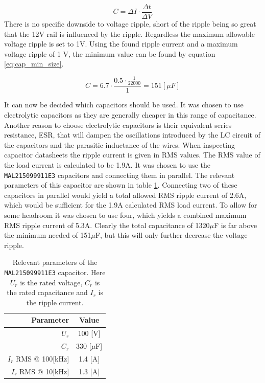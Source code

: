 \begin{equation} 
	C = \Delta I \cdot \frac{\Delta t}{\Delta V}
	\label{eq:cap_min}
\end{equation}
There is no specific downside to voltage ripple, short of the ripple being so great that the 12V rail is influenced by the ripple.
Regardless the maximum allowable voltage ripple is set to 1V.
Using the found ripple current and a maximum voltage ripple of 1 V, the minimum value can be found by equation \ref{eq:cap_min_size}.

\begin{equation} 
	C = 6.7 \cdot \frac{0.5 \cdot \frac{1}{22000}}{1 } = 151 [\mu F]
	\label{eq:cap_min_size}
\end{equation}

It can now be decided which capacitors should be used.
It was chosen to use electrolytic capacitors as they are generally cheaper in this range of capacitance. 
Another reason to choose electrolytic capacitors is their equivalent series resistance, ESR, that will dampen the oscillations introduced by the LC circuit of the capacitors and the parasitic inductance of the wires.
When inspecting capacitor datasheets the ripple current is given in RMS values. 
The RMS value of the load current is calculated to be 1.9A.
It was chosen to use the \texttt{MAL215099911E3} \cite{sup_cap} capacitors and connecting them in parallel. 
The relevant parameters of this capacitor are shown in table \ref{tab:cap_parameters}.
Connecting two of these capacitors in parallel would yield a total allowed RMS ripple current of 2.6A, which would be sufficient for the 1.9A calculated RMS load current.
To allow for some headroom it was chosen to use four, which yields a combined maximum RMS ripple current of 5.3A. 
Clearly the total capacitance of 1320$\mu$F is far above the minimum needed of 151$\mu$F, but this will only further decrease the voltage ripple.

\begin{table}[tb]
	\centering
	\begin{tabular}{|r|c|}
	\hline
		\textbf{Parameter} & \textbf{Value} \\
	\hline
		$U_r$ & 100 [V]  \\ \hline
		$C_r$ & 330 [$\mu$F]  \\ \hline
		$I_r$ RMS @ 100[kHz] & 1.4 [A]  \\ \hline
		$I_r$ RMS @ 10[kHz] & 1.3 [A]  \\ \hline
		
	\end{tabular}
	\caption[Relevant parameters of the \texttt{MAL215099911E3} capacitor.]{Relevant parameters of the \texttt{MAL215099911E3} capacitor.
	Here $U_r$ is the rated voltage, $C_r$ is the rated capacitance and $I_r$ is the ripple current.}
	\label{tab:cap_parameters}
\end{table}

